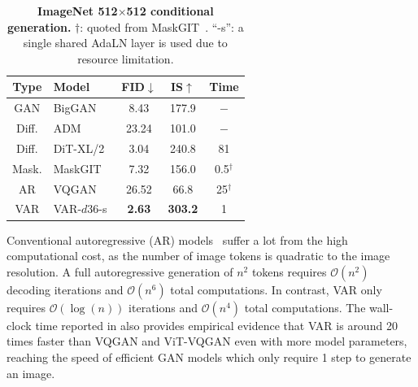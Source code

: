 \begin{table}
\renewcommand\arraystretch{1.06}
\centering
\small
{
\vspace{-12pt}
\caption{\smallcaption
\textbf{ImageNet 512$\times$512 conditional generation.}
$\dag$: quoted from MaskGIT~\cite{maskgit}. ``-s'': a single shared AdaLN layer is used due to resource limitation.
}\label{tab:512}
\vspace{5pt}
{
\begin{tabular}{c|l|ccc}%
\toprule
Type & Model          & FID$\downarrow$ & IS$\uparrow$   & Time \\
\midrule
GAN   & BigGAN~\cite{biggan}            & 8.43  & 177.9  & $-$ \\
\midrule
Diff. & ADM~\cite{adm}                  & 23.24 & 101.0  & $-$ \\
Diff. & DiT-XL/2~\cite{dit}             & 3.04  & 240.8  & 81 \\
\midrule
Mask. & MaskGIT~\cite{maskgit}          & 7.32  & 156.0  & 0.5$^\dag$ \\
\midrule
AR    & VQGAN~\cite{vqgan}              & 26.52 & 66.8   & 25$^\dag$ \\
VAR   & VAR-$d36$-s    & \textbf{2.63}  & \textbf{303.2} & 1 \\
\bottomrule
\end{tabular}
}
\vspace{-3pt}
}
\end{table}
    
    
Conventional autoregressive (AR) models~\cite{vqgan,vqvae2,vit-vqgan,rq} suffer a lot from the high computational cost, as the number of image tokens is quadratic to the image resolution.
A full autoregressive generation of $n^2$ tokens requires $\mathcal{O}(n^2)$ decoding iterations and $\mathcal{O}(n^6)$ total computations.
In contrast, VAR only requires $\mathcal{O}(\log(n))$ iterations and $\mathcal{O}(n^4)$ total computations.
The wall-clock time reported in  also provides empirical evidence that VAR is around 20 times faster than VQGAN and ViT-VQGAN even with more model parameters, reaching the speed of efficient GAN models which only require 1 step to generate an image.



